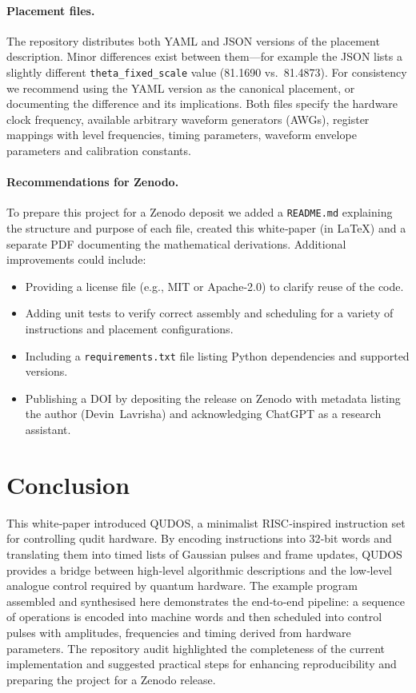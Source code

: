 \documentclass[11pt]{article}
\begin{document}
\paragraph{Placement files.}  The repository distributes both YAML
and JSON versions of the placement description.  Minor differences
exist between them—for example the JSON lists a slightly different
\texttt{theta\_fixed\_scale} value (81.1690 vs.~81.4873).  For
consistency we recommend using the YAML version as the canonical
placement, or documenting the difference and its implications.  Both
files specify the hardware clock frequency, available arbitrary
waveform generators (AWGs), register mappings with level frequencies,
timing parameters, waveform envelope parameters and calibration
constants.

\paragraph{Recommendations for Zenodo.}  To prepare this project for a
Zenodo deposit we added a \texttt{README.md} explaining the structure
and purpose of each file, created this white‑paper (in \LaTeX) and a
separate PDF documenting the mathematical derivations.  Additional
improvements could include:
\begin{itemize}
  \item Providing a license file (e.g., MIT or Apache‑2.0) to clarify
    reuse of the code.
  \item Adding unit tests to verify correct assembly and scheduling for
    a variety of instructions and placement configurations.
  \item Including a \texttt{requirements.txt} file listing Python
    dependencies and supported versions.
  \item Publishing a DOI by depositing the release on Zenodo with
    metadata listing the author (Devin Lavrisha) and acknowledging
    ChatGPT as a research assistant.
\end{itemize}

\section{Conclusion}
This white‑paper introduced QUDOS, a minimalist RISC‑inspired
instruction set for controlling qudit hardware.  By encoding
instructions into 32‑bit words and translating them into timed lists
of Gaussian pulses and frame updates, QUDOS provides a bridge between
high‑level algorithmic descriptions and the low‑level analogue control
required by quantum hardware.  The example program assembled and
synthesised here demonstrates the end‑to‑end pipeline: a sequence of
operations is encoded into machine words and then scheduled into
control pulses with amplitudes, frequencies and timing derived from
hardware parameters.  The repository audit highlighted the
completeness of the current implementation and suggested practical
steps for enhancing reproducibility and preparing the project for a
Zenodo release.
\end{document}
